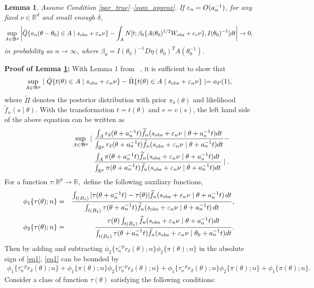 \documentclass{article}
\newtheorem{lemma}{Lemma}
\begin{document}
\begin{lemma}\label{Alemma1} Assume Condition \ref{par_true}--\ref{sum_approx}. If $\varepsilon_{n}=O(a_{n}^{-1})$, for any fixed $\nu\in\mathbb{R}^{d}$
	and small enough $\delta$, 
	\[
	\sup_{A\in\mathfrak{B}^{p}}\left|\tilde{Q}\{a_{n}(\theta-\theta_{0})\in A\mid s_{\rm obs}+\varepsilon_{n}\nu\}-\int_{A}N[t;\beta_{0}\{A(\theta_{0})^{1/2}W_{\rm obs}+c_{\varepsilon}\nu\},I(\theta_{0})^{-1}]dt\right|\rightarrow0,
	\]
	in probability as $n\rightarrow\infty$, where $\beta_{0}=I(\theta_{0})^{-1}D\eta(\theta_{0})^{T}A(\theta_{0}^{-1})$.
\end{lemma}
{\bf Proof of Lemma \ref{Alemma1}:} 
	With Lemma 1 from ~\cite{Li2017}, it is sufficient to show that 
	\[
	\sup_{A\in\mathfrak{B}^{p}}\mid\tilde{Q}\{t(\theta)\in A\mid s_{\rm obs}+\varepsilon_{n}\nu\}-\tilde{\Pi}\{t(\theta)\in A\mid s_{\rm obs}+\varepsilon_{n}\nu\}\mid=o_{P}(1),
	\]
	where $\tilde{\Pi}$ denotes the posterior distribution with prior $\pi_{\delta}(\theta)$ and likelihood $\tilde{f}_n(s \mid \theta)$. 
With the transformation $t=t(\theta)$
	and $v=v(s)$, the left hand side of the above equation can be written
	as 
	\begin{eqnarray}
	&&\sup_{A\in\mathfrak{B}^{p}}\mid\frac{\int_{A}r_{\delta}(\theta+a_{n}^{-1}t)\ftil_{n}(s_{{\rm obs}}+\veps_{n}\nu\mid\theta+a_{n}^{-1}t)dt}{\int_{\mathbb{R}^{p}}r_{\delta}(\theta+a_{n}^{-1}t)\ftil_{n}(s_{{\rm obs}}+\veps_{n}\nu\mid\theta+a_{n}^{-1}t)dt}-\hfill \\ \notag
	&&\hspace{3cm}\frac{\int_{A}\pi(\theta+a_{n}^{-1}t)\ftil_{n}(s_{{\rm obs}}+\veps_{n}\nu\mid\theta+a_{n}^{-1}t)dt}{\int_{\mathbb{R}^{p}}\pi(\theta+a_{n}^{-1}t)\ftil_{n}(s_{{\rm obs}}+\veps_{n}\nu\mid\theta+a_{n}^{-1}t)dt}\mid.\label{eq1}
	\end{eqnarray}
	For a function $\tau:\mathbb{R}^{p}\rightarrow\mathbb{R},$ define
	the following auxiliary functions,
	\begin{eqnarray*}
		\phi_{1}\{\tau(\theta);n\} & = & \frac{\int_{t(B_{\delta})}|\tau(\theta+a_{n}^{-1}t)-\tau(\theta)|\widetilde{f}_{n}(s_{{\rm obs}}+\varepsilon_{n}\nu\mid\theta+a_{n}^{-1}t)\,dt}{\int_{t(B_{\delta})}\tau(\theta+a_{n}^{-1}t)\widetilde{f}_{n}(s_{{\rm obs}}+\varepsilon_{n}\nu\mid\theta+a_{n}^{-1}t)\,dt},\\
		\phi_{2}\{\tau(\theta);n\} & = & \frac{\tau(\theta)\int_{t(B_{\delta})}\widetilde{f}_{n}(s_{{\rm obs}}+\varepsilon_{n}\nu\mid\theta+a_{n}^{-1}t)dt}{\int_{t(B_{\delta})}\tau(\theta+a_{n}^{-1}t)\widetilde{f}_{n}(s_{{\rm obs}}+\varepsilon_{n}\nu\mid\theta_{0}+a_{n}^{-1}t)dt}.
	\end{eqnarray*}
	Then by adding and subtracting $\phi_{2}\{\tau_{n}^{-p}r_{\delta}(\theta);n\}\phi_{2}\{\pi(\theta);n\}$
	in the absolute sign of \eqref{eq1}, \eqref{eq1} can be bounded
	by 
	\begin{eqnarray*}
		\phi_{1}\{\tau_{n}^{-p}r_{\delta}(\theta);n\}+\phi_{1}\{\pi(\theta);n\}\phi_{2}\{\tau_{n}^{-p}r_{\delta}(\theta);n\}+\phi_{1}\{\tau_{n}^{-p}r_{\delta}(\theta);n\}\phi_{2}\{\pi(\theta);n\}+\phi_{1}\{\pi(\theta);n\}.
	\end{eqnarray*}
	Consider a class of function $\tau(\theta)$ satisfying the following
	conditions: 
	
\end{document}
